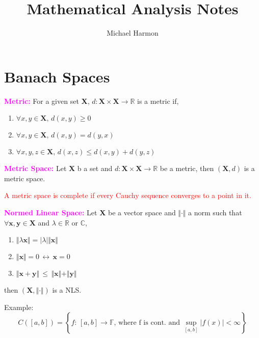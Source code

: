 \documentclass[10pt]{report}
\title{Mathematical Analysis Notes}
\author{Michael Harmon}
\numberwithin{equation}{section}
\begin{document}
\maketitle

\chapter{Banach Spaces}

\textbf{\textcolor{magenta}{Metric:}}  For a given set \textbf{X}, $d: \textbf{X} \times \textbf{X} \rightarrow \mathbb{R}$ is a metric if,

\begin{enumerate}
\item $ \forall x, y \in \textbf{X}, \, d(x,y) \geq 0$
\item $ \forall x,y \in \textbf{X}, \, d(x,y)  = d(y,x)$
\item $ \forall x, y,z  \in \textbf{X}, \, d(x,z) \leq d(x,y) + d(y,z)$
\end{enumerate}

\noindent
\textbf{\textcolor{magenta}{Metric Space:}}  Let \textbf{X} b a set and $d: \textbf{X} \times \textbf{X} \rightarrow \mathbb{R}$ be a metric, then $(\textbf{X}, d)$ is a metric space.

\vspace{2mm}

\noindent
\textcolor{red}{A metric space is complete if every Cauchy sequence converges to a point in it.}

\vspace{2mm}

\noindent
\textbf{\textcolor{magenta}{Normed Linear Space:}}  Let \textbf{X} be a vector space and $\Vert \cdot \Vert$ a norm such that $ \forall \textbf{x}, \textbf{y} \in \textbf{X}$ and $\lambda \in \mathbb{R} \text{ or } \mathbb{C}$,

\begin{enumerate}
\item $\Vert \lambda \textbf{x} \Vert = \vert \lambda \vert \Vert \textbf{x} \Vert$
\item $ \Vert \textbf{x} \Vert  = 0 \, \leftrightarrow \, \textbf{x} = 0$
\item $\Vert \textbf{x} + \textbf{y} \Vert  \, \leq \, \Vert \textbf{x} \Vert +  \Vert \textbf{y} \Vert $
\end{enumerate}

\noindent
then $\left(\textbf{X}, \Vert \cdot \Vert \right)$ is a NLS.

\vspace{2mm}

\noindent
{ \color{green} Example:
$$C([a,b]) = \left\{ 
f: \, [a,b] \rightarrow \mathbb{F} \text{, where f is cont. and } \sup_{[a,b]} \vert f(x) \vert < \infty 
\right\} $$
}
\end{document}
